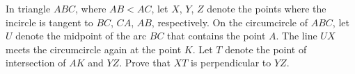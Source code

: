 In triangle $ABC$,  where $AB<AC$,  let $X$,  $Y$,  $Z$ denote the points where the incircle is tangent to $BC$,  $CA$,  $AB$,  respectively. On the circumcircle of $ABC$,  let $U$ denote the midpoint of the arc $BC$ that contains the point $A$. The line $UX$ meets the circumcircle again at the point $K$. Let $T$ denote the point of intersection of $AK$ and $YZ$. Prove that $XT$ is perpendicular to $YZ$.
